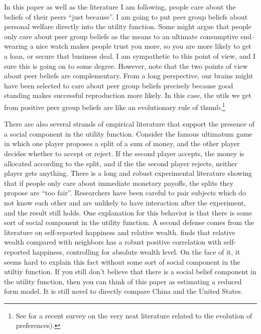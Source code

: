 \documentclass[12pt]{article}
\begin{document}
In this paper as well as the literature I am following, people care about the beliefs of their peers ``just because''.  I am going to put peer group beliefs about personal welfare directly into the utility function.  Some might argue that people only care about peer group beliefs as the means to an ultimate consumptive end--wearing a nice watch makes people trust you more, so you are more likely to get a loan, or secure that business deal.  I am sympathetic to this point of view, and I sure this is going on to some degree.  However, note that the two points of view about peer beliefs are complementary.  From a long perspective, our brains might have been selected to care about peer group beliefs precisely because good standing makes successful reproduction more likely. In this case, the utils we get from positive peer group beliefs are like an evolutionary rule of thumb.\footnote{See \citep{RobsonSamuelson2010} for a recent survey on the very neat literature related to the evolution of preferences).}

There are also several strands of empirical literature that support the presence of a social component in the utility function.  Consider the famous ultimatum game in which one player proposes a split of a sum of money, and the other player decides whether to accept or reject.  If the second player accepts, the money is allocated according to the split, and if the the second player rejects, neither player gets anything.  There is a long and robust experimental literature showing that if people only care about immediate monetary payoffs, the splits they propose are ``too fair''.  Researchers have been careful to pair subjects which do not know each other and are unlikely to have interaction after the experiment, and the result still holds.  One explanation for this behavior is that there is some sort of social component in the utility function\citep{FehrSchmidt1999,BoltonOckenfels2000}.  A second defense comes from the literature on self-reported happiness and relative wealth.  \citet{Luttmer2004} finds that relative wealth compared with neighbors has a robust positive correlation  with self-reported happiness, controlling for absolute wealth level.  On the face of it, it seems hard to explain this fact without some sort of social component in the utiltiy function.  If you still don't believe that there is a social belief component in the utility function, then you can think of this paper as estimating a reduced form model.  It is still novel to directly compare China and the United States.
\end{document}
